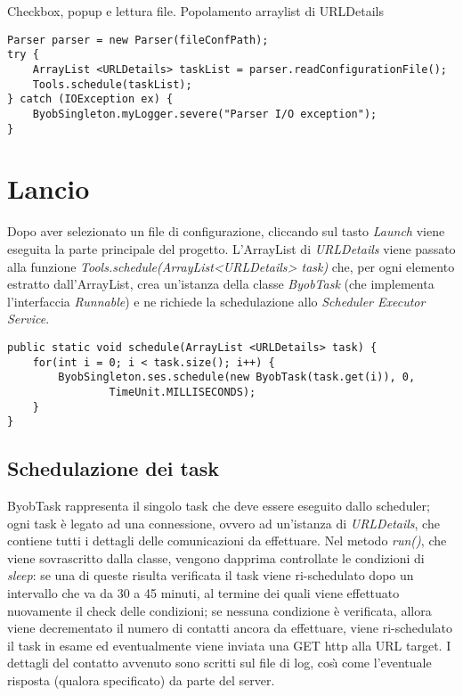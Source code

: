 Checkbox, popup e lettura file.
Popolamento arraylist di URLDetails

\vspace{0.5cm}
\begin{lstlisting}
Parser parser = new Parser(fileConfPath);
try {
	ArrayList <URLDetails> taskList = parser.readConfigurationFile();
	Tools.schedule(taskList);
} catch (IOException ex) {
	ByobSingleton.myLogger.severe("Parser I/O exception");
}
\end{lstlisting}


\section{Lancio}
Dopo aver selezionato un file di configurazione, cliccando sul tasto \textit{Launch} viene eseguita la parte principale del progetto.
L'ArrayList di \textit{URLDetails} viene passato alla funzione \textit{Tools.schedule(ArrayList<URLDetails> task)} che, per ogni elemento estratto dall'ArrayList, crea un'istanza della classe \textit{ByobTask} (che implementa l'interfaccia \textit{Runnable}) e ne richiede la schedulazione allo \textit{Scheduler Executor Service}.

\vspace{0.5cm}
\begin{lstlisting}
public static void schedule(ArrayList <URLDetails> task) {
    for(int i = 0; i < task.size(); i++) {
	    ByobSingleton.ses.schedule(new ByobTask(task.get(i)), 0,
			    TimeUnit.MILLISECONDS);
    }
}
\end{lstlisting}


\subsection{Schedulazione dei task}
ByobTask rappresenta il singolo task che deve essere eseguito dallo scheduler; ogni task \`{e} legato ad una connessione, ovvero ad un'istanza di \textit{URLDetails}, che contiene tutti i dettagli delle comunicazioni da effettuare.
Nel metodo \textit{run()}, che viene sovrascritto dalla classe, vengono dapprima controllate le condizioni di \textit{sleep}: 
se una di queste risulta verificata il task viene ri-schedulato dopo un intervallo che va da 30 a 45 minuti, al termine dei quali viene effettuato nuovamente il check delle condizioni;
se nessuna condizione \`{e} verificata, allora viene decrementato il numero di contatti ancora da effettuare, viene ri-schedulato il task in esame ed eventualmente viene inviata una GET http alla URL target.
I dettagli del contatto avvenuto sono scritti sul file di log, cos\`{\i} come l'eventuale risposta (qualora specificato) da parte del server.

